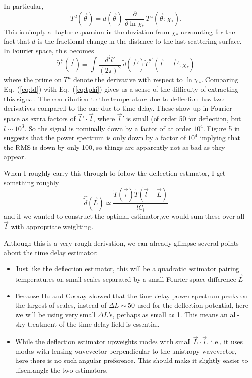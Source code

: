 \documentclass[prd,amsmath,amssymb,floatfix,superscriptaddress,nofootinbib,preprintnumbers]{revtex4-1}
\def\be{\begin{equation}}
\def\ee{\end{equation}}
\newcommand{\ec}[1]{Eq.~(\ref{eq:#1})}
\newcommand{\eql}[1]{\label{eq:#1}}
\begin{document}
In particular,
\be
T^d(\vec\theta) = d(\vec\theta)\,\frac{\partial}{\partial\ln\chi_*}\, T^u(\vec\theta;\chi_*).
\ee
This is simply a Taylor expansion in the deviation from $\chi_*$ accounting for the fact that $d$ is the fractional change in the distance to the last scattering surface. In Fourier space, this becomes
\begin{equation}
\tilde T^d(\vec l) = \int \frac{d^2l'}{(2\pi)^2}\, \tilde d(\vec l') \tilde T^{u'}(\vec l-\vec l';\chi_*) %
\eql{td}\end{equation}
where the prime on $T^u$ denote the  derivative with respect to $\ln\chi_*$. Comparing \ec{td} with \ec{tphi}  gives us a sense of the difficulty of extracting this signal. The contribution to the temperature due to deflection has two derivatives compared to the one due to time delay. These show up in Fourier space as extra factors of $\vec l'\cdot\vec l$, where $\vec l'$ is small (of order 50 for deflection, but $l\sim 10^3$. So the signal is nominally down by a factor of at order $10^4$. Figure 5 in \cite{Hu:2001yq} suggests that the power spectrum is only down by a factor of $10^4$ implying that the RMS is down by only 100, so things are apparently not as bad as they appear. %

When I roughly carry this through to follow the deflection estimator, I get something roughly 
\begin{equation}
\hat{\tilde d}(\vec L) \simeq \frac{\tilde T(\vec l) \tilde T(\vec l -\vec L)}{lC_l}
\end{equation}
and if we wanted to construct the optimal estimator,we would sum these over all $\vec l$ with appropriate weighting.

Although this is a very rough derivation, we can already glimpse several points about the time delay estimator:
\begin{itemize}
\item Just like the deflection estimator, this will be a quadratic estimator pairing temperatures on small scales separated by a small Fourier space difference $\vec L$
\item Because Hu and Cooray showed that the time delay power spectrum peaks on the largest of scales, instead of $\Delta L\sim 50$ used for the deflection potential, here we will be using very small $\Delta L$'s, perhaps as small as 1. This means an all-sky treatment of the time delay field is essential.
\item While the deflection estimator upweights modes with small $\vec L\cdot \vec l$, i.e., it uses modes with lensing wavevector perpendicular to the anistropy wavevector, here there is no such angular preference. This should make it slightly easier to disentangle the two estimators.
\end{itemize}
\end{document}
